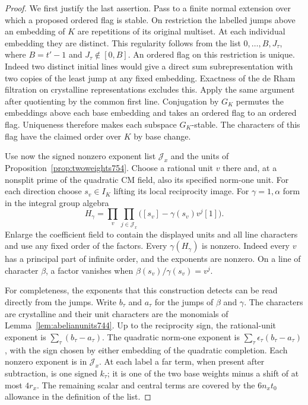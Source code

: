 \documentclass[a4paper,11pt]{article}
\theoremstyle{definition}
\theoremstyle{remark}
\numberwithin{equation}{section}
\begin{document}
\begin{proof}
We first justify the last assertion. Pass to a finite normal
extension over which a proposed ordered flag is stable. On
restriction the labelled jumps above an embedding of \(K\) are
repetitions of its original multiset. At each individual embedding
they are distinct. This regularity follows from the list
\(0,\ldots,B,J_\tau\), where \(B=t'-1\) and \(J_\tau\notin[0,B]\).
An ordered flag on this restriction is unique. Indeed two distinct
initial lines would give a direct sum subrepresentation with two
copies of the least jump at any fixed embedding. Exactness of the
de Rham filtration on crystalline representations excludes this.
Apply the same argument after quotienting by the common first line.
Conjugation by \(G_K\) permutes the embeddings above each base
embedding and takes an ordered flag to an ordered flag. Uniqueness
therefore makes each subspace \(G_K\)-stable. The characters of
this flag have the claimed order over \(K\) by base change.

Use now the signed nonzero exponent list \(\mathcal J_x\) and the
units of Proposition~\ref{prop:twoweights754}. Choose a rational
unit \(v\) there and, at a nonsplit prime of the quadratic CM field,
also its specified norm-one unit. For each direction choose
\(s_v\in I_K\) lifting its local reciprocity image. For
\(\gamma=1,\alpha\) form in the integral group algebra
\[
 H_\gamma=\prod_{v}\prod_{j\in\mathcal J_x}
               \big([s_v]-\gamma(s_v)v^j[1]\big).
\]
Enlarge the coefficient field to contain the displayed units and
all line characters and use any fixed order of the factors.
Every \(\gamma(H_\gamma)\) is nonzero. Indeed every \(v\) has a
principal part of infinite order, and the exponents are nonzero.
On a line of character \(\beta\), a factor vanishes when
\(\beta(s_v)/\gamma(s_v)=v^j\).

For completeness, the exponents that this construction detects
can be read directly from the jumps. Write \(b_\tau\) and \(a_\tau\)
for the jumps of \(\beta\) and \(\gamma\). The characters are
crystalline and their unit characters are the monomials of
Lemma~\ref{lem:abelianunits744}. Up to the reciprocity sign,
the rational-unit exponent is \(\sum_\tau(b_\tau-a_\tau)\).
The quadratic norm-one exponent is
\(\sum_\tau\epsilon_\tau(b_\tau-a_\tau)\), with the sign chosen
by either embedding of the quadratic completion. Each nonzero
exponent is in \(\mathcal J_x\). At each label a far term, when
present after subtraction, is one signed \(k_\tau\); it is one
of the two base weights minus a shift of at most \(4r_x\).
The remaining scalar and central terms are covered by the
\(6n_xt_0\) allowance in the definition of the list.


\end{proof}
\end{document}
